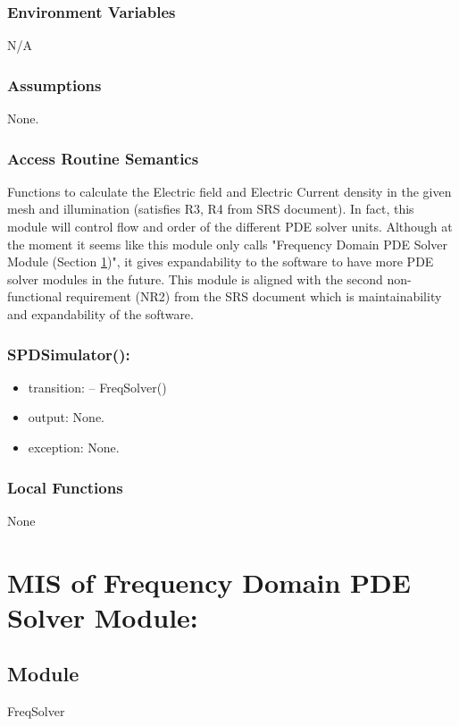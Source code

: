 \documentclass[12pt, titlepage]{article}
\begin{document}
	\subsubsection{Environment Variables} N/A
	
	\subsubsection{Assumptions} None.
	
	\subsubsection{Access Routine Semantics} Functions to calculate the Electric
	field and Electric Current density in the given mesh and illumination (satisfies
	R3, R4 from SRS document). In fact, this module will control flow and order of
	the different PDE solver units. Although at the moment it seems like this module
	only calls "Frequency Domain PDE Solver Module (Section \ref{FDSM})", it gives
	expandability to the software to have more PDE solver modules in the future.
	This module is aligned with the second non-functional requirement (NR2) from the
	SRS document which is maintainability and expandability of the software.
	
	\subsubsection*{SPDSimulator():} \begin{itemize} \item transition: \subitem --
		FreqSolver() \item output: None. \item exception: None. \end{itemize}
	
	\subsubsection{Local Functions} None
	
	
	
	\newpage %
	\section{MIS of Frequency Domain PDE Solver Module:} \label{FDSM}
	
	
	\subsection{Module} FreqSolver
	
\end{document}

